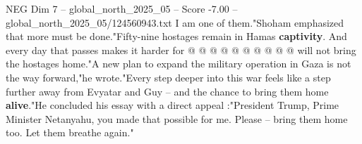 \begin{textsample}{NEG Dim 7 – global\_north\_2025\_05 – Score -7.00 – global\_north\_2025\_05/124560943.txt}
I am one of them."Shoham emphasized that more must be done."Fifty-nine hostages remain in Hamas \textbf{captivity}.
And every day that passes makes it harder for @ @ @ @ @ @ @ @ @ @ will not bring the hostages home."A new plan to expand the military operation in Gaza is not the way forward,"he wrote."Every step deeper into this war feels like a step further away from Evyatar and Guy -- and the chance to bring them home \textbf{alive}."He concluded his essay with a direct appeal :"President Trump, Prime Minister Netanyahu, you made that possible for me.
Please -- bring them home too.
Let them breathe again."

\end{textsample}
